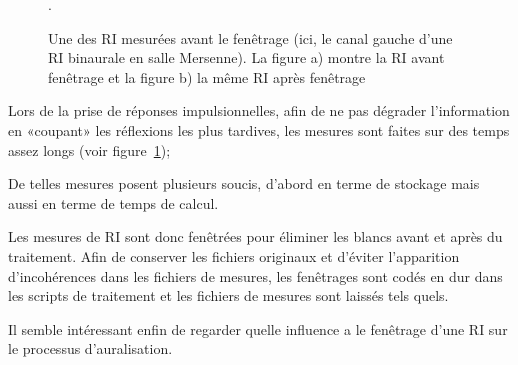 \begin{figure}[h!]
\caption{\label{ri_non_recoupee}Une des RI mesurées avant le fenêtrage (ici, le canal gauche d'une RI binaurale en salle
Mersenne). La figure a) montre la RI avant fenêtrage et la figure b) la même RI après fenêtrage}.
\end{figure}

Lors de la prise de réponses impulsionnelles, afin de ne pas dégrader l'information en «coupant» les réflexions les plus
tardives, les mesures sont faites sur des temps assez longs (voir figure~\ref{ri_non_recoupee});

De telles mesures posent plusieurs soucis, d'abord en terme de stockage mais aussi en terme de temps de calcul.

Les mesures de RI sont donc fenêtrées pour éliminer les blancs avant et après du traitement. Afin de conserver les
fichiers originaux et d'éviter l'apparition d'incohérences dans les fichiers de mesures, les fenêtrages sont codés en
dur dans les scripts de traitement et les fichiers de mesures sont laissés tels quels.

Il semble intéressant enfin de regarder quelle influence a le fenêtrage d'une RI sur le processus d'auralisation.

